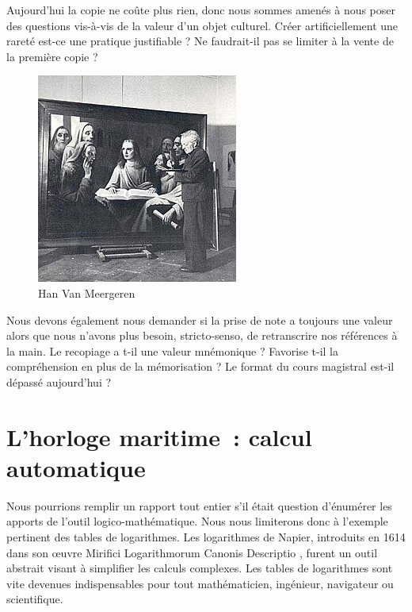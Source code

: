 \begin{minipage}[H]{0.44\linewidth}
Aujourd'hui la copie ne coûte plus rien, donc nous sommes amenés à nous poser des questions vis-à-vis de la valeur d'un objet culturel. Créer artificiellement une rareté est-ce une pratique justifiable ? Ne faudrait-il pas se limiter à la vente de la première copie ?
\vspace{1cm}
\end{minipage}
\begin{minipage}[H]{0.54\linewidth}
  \begin{figure}[H]
  \centering
  \includegraphics[height=0.15\paperheight]{../resources/illustrations/meergeren}
  \caption{Han Van Meergeren}
  \end{figure}
\end{minipage}

Nous devons également nous demander si la prise de note a toujours une valeur alors que nous n'avons plus besoin, stricto-senso, de retranscrire nos références à la main. Le recopiage a t-il une valeur mnémonique ? Favorise t-il la compréhension en plus de la mémorisation ? Le format du cours magistral est-il dépassé aujourd'hui ?

\chapter{L'horloge maritime~: calcul automatique}
Nous pourrions remplir un rapport tout entier s'il était question d'énumérer les apports de l'outil logico-mathématique. Nous nous limiterons donc à l'exemple pertinent des tables de logarithmes. Les logarithmes de Napier, introduits en 1614 dans son œuvre \og  Mirifici Logarithmorum Canonis Descriptio \fg{}, furent un outil abstrait visant à simplifier les calculs complexes. Les tables de logarithmes sont vite devenues indispensables pour tout mathématicien, ingénieur, navigateur ou scientifique.

